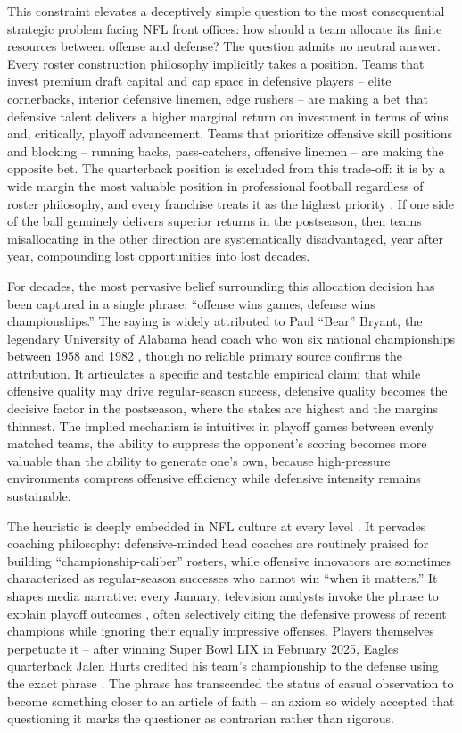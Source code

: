This constraint elevates a deceptively simple question to the most consequential strategic problem facing NFL front offices: how should a team allocate its finite resources between offense and defense? The question admits no neutral answer. Every roster construction philosophy implicitly takes a position. Teams that invest premium draft capital and cap space in defensive players  -- elite cornerbacks, interior defensive linemen, edge rushers  -- are making a bet that defensive talent delivers a higher marginal return on investment in terms of wins and, critically, playoff advancement. Teams that prioritize offensive skill positions and blocking  -- running backs, pass-catchers, offensive linemen  -- are making the opposite bet. The quarterback position is excluded from this trade-off: it is by a wide margin the most valuable position in professional football regardless of roster philosophy, and every franchise treats it as the highest priority \parencite{yurko2019nflwar}. If one side of the ball genuinely delivers superior returns in the postseason, then teams misallocating in the other direction are systematically disadvantaged, year after year, compounding lost opportunities into lost decades.

For decades, the most pervasive belief surrounding this allocation decision has been captured in a single phrase: ``offense wins games, defense wins championships.'' The saying is widely attributed to Paul ``Bear'' Bryant, the legendary University of Alabama head coach who won six national championships between 1958 and 1982 \parencite{williams2010bearbryant}, though no reliable primary source confirms the attribution. It articulates a specific and testable empirical claim: that while offensive quality may drive regular-season success, defensive quality becomes the decisive factor in the postseason, where the stakes are highest and the margins thinnest. The implied mechanism is intuitive: in playoff games between evenly matched teams, the ability to suppress the opponent's scoring becomes more valuable than the ability to generate one's own, because high-pressure environments compress offensive efficiency while defensive intensity remains sustainable.

The heuristic is deeply embedded in NFL culture at every level \parencite{billick2001championship}. It pervades coaching philosophy: defensive-minded head coaches are routinely praised for building ``championship-caliber'' rosters, while offensive innovators are sometimes characterized as regular-season successes who cannot win ``when it matters.'' It shapes media narrative: every January, television analysts invoke the phrase to explain playoff outcomes \parencite{katz2016defense}, often selectively citing the defensive prowess of recent champions while ignoring their equally impressive offenses. Players themselves perpetuate it  -- after winning Super Bowl LIX in February 2025, Eagles quarterback Jalen Hurts credited his team's championship to the defense using the exact phrase \parencite{smith2025hurts}. The phrase has transcended the status of casual observation to become something closer to an article of faith  -- an axiom so widely accepted that questioning it marks the questioner as contrarian rather than rigorous.

